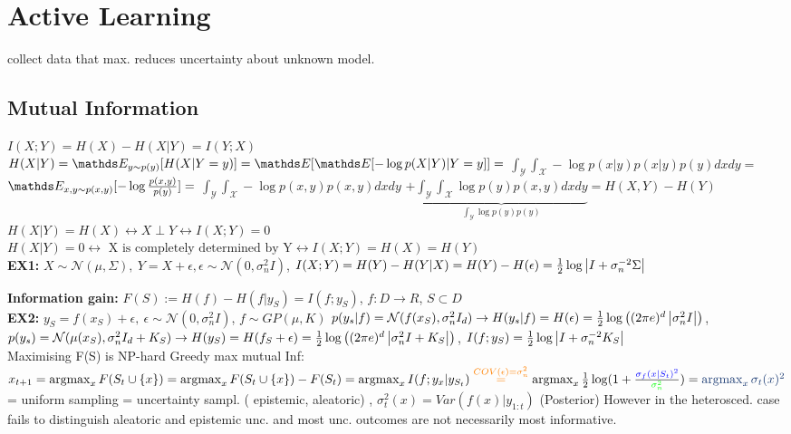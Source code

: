 \section{Active Learning}
collect data that max. reduces uncertainty about unknown model.
\subsection{Mutual Information}
$I(X;Y)=H(X)-H(X|Y)=I(Y;X)$\\
$H(X|Y) = \E[y \sim p(y)]{H(X|Y=y)} = \E{\E{-\log p(X|Y)|Y=y}} =$
$\int_{\mathcal{Y}}\int_{\mathcal{X}} -\log p(x|y) p(x|y) p(y) dx dy=$
$\E[x,y \sim p(x,y)]{-\log \frac{p(x,y)}{p(y)}} =$
$\int_{\mathcal{Y}}\int_{\mathcal{X}} - \log p(x,y) p(x,y) dx dy$
$+ \underbrace{\int_{\mathcal{Y}}\int_{\mathcal{X}} \log p(y) p(x,y) dx dy}_{\int_{\mathcal{Y}} \log p(y) p(y)}
= H(X,Y) - H(Y)$
$ H(X|Y) = H(X) \leftrightarrow X \perp Y \leftrightarrow I(X;Y) = 0$\\
$H(X|Y)=0 \leftrightarrow \text{ X is completely determined by Y} \leftrightarrow  I(X;Y) = H(X) = H(Y)$\\
\textbf{EX1:} $X \sim \mathcal{N}(\mu, \Sigma),\ Y=X+\epsilon,
\epsilon \sim \mathcal{N}(0, \sigma_{n}^{2}I)$,
$I(X;Y)=H(Y)-H(Y|X) = H(Y)-H(\epsilon) = \frac{1}{2} \log \left\lvert I+ \sigma_{n}^{-2}\Sigma\right\rvert$

\textbf{Information gain:}
$F(S) := H(f)-H(f|y_{S}) = I(f;y_{S})$, $f: D \rightarrow R$, $S \subset D$\\
\textbf{\color{orange} EX2:}\color{black} $y_{S} = f(x_{S}) + \epsilon,\ \epsilon \sim \mathcal{N}(0, \sigma_{n}^{2}I)$, $f \sim GP(\mu, K)$
$p(y_{s}|f) = \mathcal{N}(f(x_{S}), \sigma_{n}^{2} I_{d})
\rightarrow H(y_{s}|f) = H(\epsilon)= \frac{1}{2}\log \left((2\pi e)^{d} \left\lvert\sigma_{n}^{2}I\right\rvert\right)$,
$p(y_{s}) = \mathcal{N}(\mu(x_{S}), \sigma_{n}^{2} I_{d} + K_{S})
\rightarrow H(y_{S}) = H(f_{S} + \epsilon) =\frac{1}{2}\log \left((2\pi e)^{d} \left\lvert\sigma_{n}^{2}I + K_{S}\right\rvert\right)$,
$I(f;y_{S}) = \frac{1}{2} \log \left\lvert I+ \sigma_{n}^{-2} K_{S}\right\rvert$\\

Maximising F(S) is NP-hard \textrightarrow Greedy max mutual Inf:
$x_{t+1} = \argmax_{x}F(S_{t} \cup \{x\}) = \argmax_{x}F(S_{t} \cup \{x\}) -F(S_{t}) =
\argmax_{x}I(f; y_{x}|y_{S_{t}})
\overset{\color{orange} COV(\epsilon)=\sigma_{n}^{2}}{=}
\argmax_{x}\frac{1}{2} \log (1 + \frac{\color{blue}\sigma_{f}(x|S_{t})^{2}}{\color{green}{\sigma_{n}^{2}}})=
\color{myblue}\argmax_{x}\sigma_{t}(x)^{2}$ = uniform sampling = uncertainty sampl. (\color{blue} epistemic,
\color{green} aleatoric) \color{black}, $\sigma_{t}^2(x)=Var(f(x)|y_{1:t})$ (Posterior)
However in the heterosced. case fails to distinguish aleatoric and epistemic unc. and
most unc. outcomes are not necessarily most informative.

